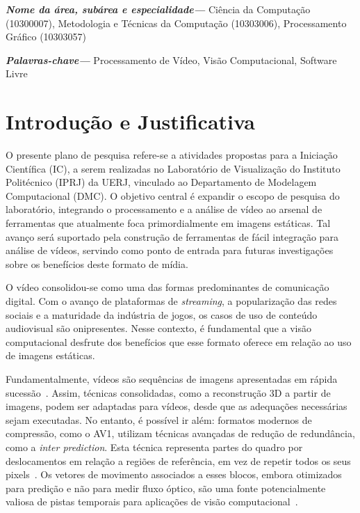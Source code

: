\documentclass[a4paper,titlepage]{article}
\begin{document}
\hypersetup{pageanchor=false}\hypersetup{pageanchor=true}
\onehalfspacing

\providecommand{\keywords}[1]
{
  \small
  \textbf{\textit{Palavras-chave---}} #1
}

\providecommand{\areaname}[1]
{
  \small
  \textbf{\textit{Nome da área, subárea e especialidade---}} #1
}

\areaname{Ciência da Computação (10300007), Metodologia e Técnicas da Computação (10303006), Processamento Gráfico (10303057)}

\keywords{Processamento de Vídeo, Visão Computacional, Software Livre}

\section{Introdução e Justificativa}

O presente plano de pesquisa refere-se a atividades propostas para a Iniciação Científica (IC), a serem realizadas no Laboratório de Visualização do Instituto Politécnico (IPRJ) da UERJ, vinculado ao Departamento de Modelagem Computacional (DMC). O objetivo central é expandir o escopo de pesquisa do laboratório, integrando o processamento e a análise de vídeo ao arsenal de ferramentas que atualmente foca primordialmente em imagens estáticas. Tal avanço será suportado pela construção de ferramentas de fácil integração para análise de vídeos, servindo como ponto de entrada para futuras investigações sobre os benefícios deste formato de mídia.

O vídeo consolidou-se como uma das formas predominantes de comunicação digital. Com o avanço de plataformas de \emph{streaming}, a popularização das redes sociais e a maturidade da indústria de jogos, os casos de uso de conteúdo audiovisual são onipresentes. Nesse contexto, é fundamental que a visão computacional desfrute dos benefícios que esse formato oferece em relação ao uso de imagens estáticas.

Fundamentalmente, vídeos são sequências de imagens apresentadas em rápida sucessão~\cite{videodismistified}. Assim, técnicas consolidadas, como a reconstrução 3D a partir de imagens, podem ser adaptadas para vídeos, desde que as adequações necessárias sejam executadas. No entanto, é possível ir além: formatos modernos de compressão, como o AV1, utilizam técnicas avançadas de redução de redundância, como a \emph{inter prediction}. Esta técnica representa partes do quadro por deslocamentos em relação a regiões de referência, em vez de repetir todos os seus pixels~\cite{aomedia2021av1}. Os vetores de movimento associados a esses blocos, embora otimizados para predição e não para medir fluxo óptico, são uma fonte potencialmente valiosa de pistas temporais para aplicações de visão computacional~\cite{computer_vision,av1motion}.
\end{document}
